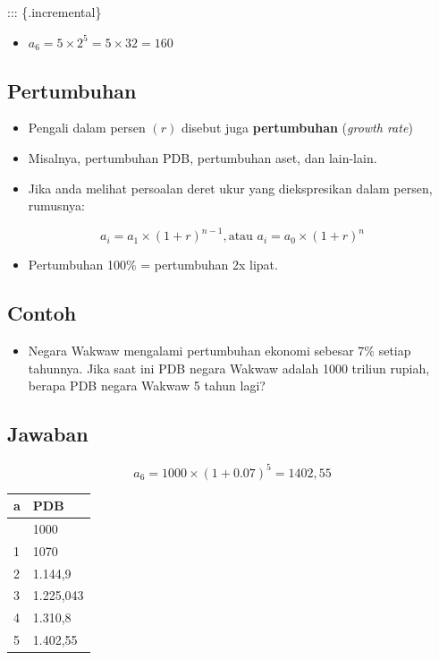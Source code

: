 \documentclass[
  letterpaper,
  DIV=11,
  numbers=noendperiod]{scrartcl}
\providecommand{\tightlist}{%
  \setlength{\itemsep}{0pt}\setlength{\parskip}{0pt}}\usepackage{longtable,booktabs,array}
\begin{document}
::: \{.incremental\}

\begin{itemize}
\tightlist
\item
  \(a_6=5 \times 2^5=5 \times 32=160\)
\end{itemize}

\hypertarget{pertumbuhan}{%
\subsection{Pertumbuhan}\label{pertumbuhan}}

\begin{itemize}
\item
  Pengali dalam persen \((r)\) disebut juga \textbf{pertumbuhan}
  (\emph{growth rate})
\item
  Misalnya, pertumbuhan PDB, pertumbuhan aset, dan lain-lain.
\item
  Jika anda melihat persoalan deret ukur yang diekspresikan dalam
  persen, rumusnya:
\end{itemize}

\[
a_i=a_1\times (1+r)^{n-1}, \text{atau } a_i=a_0 \times (1+r)^{n}
\]

\begin{itemize}
\tightlist
\item
  Pertumbuhan 100\% = pertumbuhan 2x lipat.
\end{itemize}

\hypertarget{contoh-4}{%
\subsection{Contoh}\label{contoh-4}}

\begin{itemize}
\tightlist
\item
  Negara Wakwaw mengalami pertumbuhan ekonomi sebesar 7\% setiap
  tahunnya. Jika saat ini PDB negara Wakwaw adalah 1000 triliun rupiah,
  berapa PDB negara Wakwaw 5 tahun lagi?
\end{itemize}

\hypertarget{jawaban-1}{%
\subsection{Jawaban}\label{jawaban-1}}

\[a_6=1000 \times (1+0.07)^5=1402,55\]

\begin{longtable}[]{@{}ll@{}}
\toprule\noalign{}
a & PDB \\
\midrule\noalign{}
\endhead
\bottomrule\noalign{}
\endlastfoot
0 & 1000 \\
1 & 1070 \\
2 & 1.144,9 \\
3 & 1.225,043 \\
4 & 1.310,8 \\
5 & 1.402,55 \\
\end{longtable}
\end{document}
